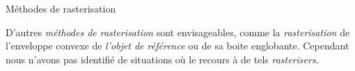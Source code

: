 \begin{table}
  \centering
  
  \caption{Méthodes de rasterisation}
  \label{tab:methode_rasterisation}
\end{table}

D'autres \emph{méthodes de rasterisation} sont envisageables, comme la \emph{rasterisation} de l'enveloppe convexe de \emph{l'objet de référence} ou de sa boite englobante. Cependant nous n'avons pas identifié de situations où le recours à de tels \emph{rasterisers.}

